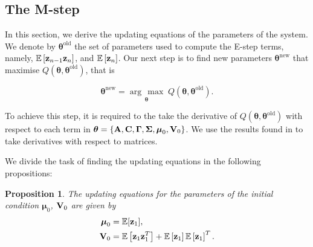 \documentclass[11pt]{article}
\numberwithin{equation}{section}
\newcommand{\argmax}[1]{\underset{#1}{\operatorname{arg}\,\operatorname{max}}\;}
\newcommand{\expectation}[1]{\mathbb{E}\left[#1\right]}
\newcommand{\z}{{\bf z}}
\newtheorem{proposition}{Proposition}[section]
\begin{document}
\subsection{The M-step}
In this section, we derive the updating equations of the parameters of the system. We denote by $\boldsymbol{\theta}^\text{old}$ the set of parameters used to compute the E-step terms, namely, $\expectation{\z_{n-1}\z_{n}}$, and $\expectation{\z_{n}}$. Our next step is to find new parameters $\boldsymbol{\theta}^\text{new}$ that maximise $Q(\boldsymbol\theta, \boldsymbol\theta^\text{old})$, that is

\begin{equation}
	\boldsymbol{\theta}^\text{new} = \argmax{\boldsymbol\theta} Q(\boldsymbol\theta, \boldsymbol\theta^\text{old}).
\end{equation}

To achieve this step, it is required to the take the derivative of $Q(\boldsymbol{\theta}, \boldsymbol{\theta}^\text{old})$ with respect to each term in $\boldsymbol\theta = \{{\bf A}, {\bf C}, \boldsymbol\Gamma, \boldsymbol\Sigma, \boldsymbol\mu_0, {\bf V}_0\}$. We use the results found in \cite{matrix-cookbook} to take derivatives with respect to matrices.

We divide the task of finding the updating equations in the following propositions:

\begin{proposition}
	The updating equations for the parameters of the initial condition $\boldsymbol{\mu}_0$, ${\bf V}_0$ are given by
	\begin{align}
		\boldsymbol{\mu}_0 &= \mathbb{E}[{\z_1}], \\
		{\bf V}_0 &= \expectation{\z_1 \z_1^T} + \expectation{\z_1}\expectation{\z_1}^T.
	\end{align}
\end{proposition}
\end{document}
